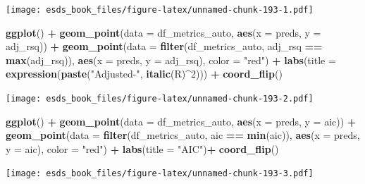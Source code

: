 \documentclass[
]{book}
\newenvironment{Shaded}{\begin{snugshade}}{\end{snugshade}}
\newcommand{\DataTypeTok}[1]{\textcolor[rgb]{0.13,0.29,0.53}{#1}}
\newcommand{\DecValTok}[1]{\textcolor[rgb]{0.00,0.00,0.81}{#1}}
\newcommand{\KeywordTok}[1]{\textcolor[rgb]{0.13,0.29,0.53}{\textbf{#1}}}
\newcommand{\NormalTok}[1]{#1}
\newcommand{\OperatorTok}[1]{\textcolor[rgb]{0.81,0.36,0.00}{\textbf{#1}}}
\newcommand{\StringTok}[1]{\textcolor[rgb]{0.31,0.60,0.02}{#1}}
\begin{document}
\texttt{[image: esds\_book\_files/figure-latex/unnamed-chunk-193-1.pdf]}

\begin{Shaded}
\begin{Highlighting}[]
\KeywordTok{ggplot}\NormalTok{() }\OperatorTok{+}
\StringTok{  }\KeywordTok{geom_point}\NormalTok{(}\DataTypeTok{data =}\NormalTok{ df_metrics_auto, }\KeywordTok{aes}\NormalTok{(}\DataTypeTok{x =}\NormalTok{ preds, }\DataTypeTok{y =}\NormalTok{ adj_rsq)) }\OperatorTok{+}
\StringTok{  }\KeywordTok{geom_point}\NormalTok{(}\DataTypeTok{data =} \KeywordTok{filter}\NormalTok{(df_metrics_auto, adj_rsq }\OperatorTok{==}\StringTok{ }\KeywordTok{max}\NormalTok{(adj_rsq)), }\KeywordTok{aes}\NormalTok{(}\DataTypeTok{x =}\NormalTok{ preds, }\DataTypeTok{y =}\NormalTok{ adj_rsq), }\DataTypeTok{color =} \StringTok{"red"}\NormalTok{) }\OperatorTok{+}
\StringTok{  }\KeywordTok{labs}\NormalTok{(}\DataTypeTok{title =} \KeywordTok{expression}\NormalTok{(}\KeywordTok{paste}\NormalTok{(}\StringTok{"Adjusted-"}\NormalTok{, }\KeywordTok{italic}\NormalTok{(R)}\OperatorTok{^}\DecValTok{2}\NormalTok{))) }\OperatorTok{+}\StringTok{ }
\StringTok{  }\KeywordTok{coord_flip}\NormalTok{()}
\end{Highlighting}
\end{Shaded}

\texttt{[image: esds\_book\_files/figure-latex/unnamed-chunk-193-2.pdf]}

\begin{Shaded}
\begin{Highlighting}[]
\KeywordTok{ggplot}\NormalTok{() }\OperatorTok{+}
\StringTok{  }\KeywordTok{geom_point}\NormalTok{(}\DataTypeTok{data =}\NormalTok{ df_metrics_auto, }\KeywordTok{aes}\NormalTok{(}\DataTypeTok{x =}\NormalTok{ preds, }\DataTypeTok{y =}\NormalTok{ aic)) }\OperatorTok{+}
\StringTok{  }\KeywordTok{geom_point}\NormalTok{(}\DataTypeTok{data =} \KeywordTok{filter}\NormalTok{(df_metrics_auto, aic }\OperatorTok{==}\StringTok{ }\KeywordTok{min}\NormalTok{(aic)), }\KeywordTok{aes}\NormalTok{(}\DataTypeTok{x =}\NormalTok{ preds, }\DataTypeTok{y =}\NormalTok{ aic), }\DataTypeTok{color =} \StringTok{"red"}\NormalTok{) }\OperatorTok{+}
\StringTok{  }\KeywordTok{labs}\NormalTok{(}\DataTypeTok{title =} \StringTok{"AIC"}\NormalTok{)}\OperatorTok{+}\StringTok{ }
\StringTok{  }\KeywordTok{coord_flip}\NormalTok{()}
\end{Highlighting}
\end{Shaded}

\texttt{[image: esds\_book\_files/figure-latex/unnamed-chunk-193-3.pdf]}
\end{document}
